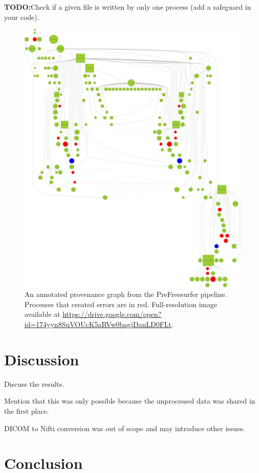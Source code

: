 \documentclass{article}
\newcommand{\todo}[1]{\color{red}\textbf{TODO:}#1\color{black}}
\begin{document}
\todo{Check if a given file is written by only one process (add a safeguard in your code).}

\begin{figure}
  \includegraphics[width=\linewidth]{images/graph}
  \caption{An annotated provenance graph from the PreFreesurfer pipeline. Processes that created errors are in red. 
Full-resolution image available at \url{https://drive.google.com/open?id=174yyn8SuVOUcK5aRVw0bagjDanLD0FLt}.}
  \label{fig:2}
\end{figure}

\section{Discussion}

Discuss the results.

Mention that this was only possible because the unprocessed data was shared in the first place.

DICOM to Nifti conversion was out of scope and may introduce other issues.

\section{Conclusion}
\end{document}
